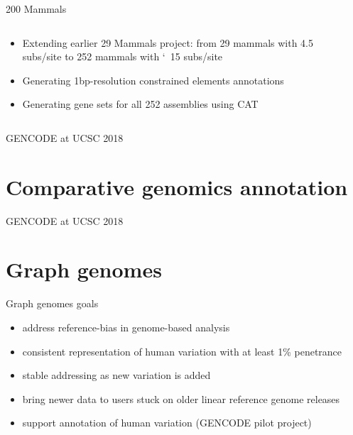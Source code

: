 \documentclass[10pt,
               hyperref={bookmarks=false,
                         bookmarksopen=false,
                         colorlinks=true,
                         linkcolor=blue,
                         urlcolor=blue},
               xcolor={svgnames,table}]{beamer}
\newcommand{\sectionframe}[1]{
  \begin{frame}{GENCODE at UCSC 2018}
    \section{#1}
  \end{frame}
}
\begin{document}
\begin{frame}{200 Mammals}
  \begin{columns}
    \begin{column}{0.5\textwidth}
      \begin{itemize}
          \item Extending earlier 29 Mammals project: from 29 mammals with 4.5 subs/site to 252 mammals with \char`~15 subs/site
          \item Generating 1bp-resolution constrained elements annotations
          \item Generating gene sets for all 252 assemblies using CAT
      \end{itemize}
    \end{column}
    \begin{column}{0.5\textwidth}
    \end{column}
  \end{columns}
\end{frame}

\sectionframe{Comparative genomics annotation}

\sectionframe{Graph genomes}

\begin{frame}{Graph genomes goals}
  \begin{itemize}
  \item address reference-bias in genome-based analysis
  \item consistent representation of human variation with at least 1\% penetrance
  \item stable addressing as new variation is added
  \item bring newer data to users stuck on older linear reference genome releases
  \item support annotation of human variation (GENCODE pilot project)
  \end{itemize}
\end{frame}
\end{document}
